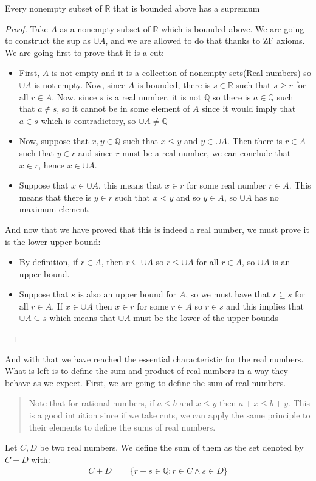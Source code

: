 \documentclass{tufte-handout}
\begin{document}
\begin{theorem}
	Every nonempty subset of $\mathbb{R}$ that is bounded above has a supremum
\end{theorem}
\begin{proof}
	Take $A$ as a nonempty subset of $\mathbb{R}$ which is bounded above. We are going to construct the sup as $\cup A$, and we are allowed to do that thanks to ZF axioms. We are going first to prove that it is a cut:
	\begin{itemize}
		\item First, $A$ is not empty and it is a collection of nonempty sets(Real numbers) so $\cup A$ is not empty. Now, since $A$ is bounded, there is $s \in \mathbb{R}$ such that $s \ge r$ for all $r \in A$. Now, since $s$ is a real number, it is not $\mathbb{Q}$ so there is $a \in \mathbb{Q}$ such that $a \not \in s$, so it cannot be in some element of $A$ since it would imply that $a \in s$ which is contradictory, so $\cup A \neq \mathbb{Q}$
		\item Now, suppose that $x, y \in \mathbb{Q}$ such that $x \le y$ and $y \in \cup A$. Then there is $r \in A$ such that $y \in r$ and since $r$ must be a real number, we can conclude that $x \in r$, hence $x \in \cup A$.
		\item Suppose that $x \in \cup A$, this means that $x \in r$ for some real number $r \in A$. This means that there is $y \in r$ such that $x < y$ and so $y \in A$, so $\cup A$ has no maximum element.
	\end{itemize}
	And now that we have proved that this is indeed a real number, we must prove it is the lower upper bound:
	\begin{itemize}
		\item By definition, if $r \in A$, then $r \subseteq \cup A$ so $r \le \cup A$ for all $r \in A$, so $\cup A$ is an upper bound.
		\item Suppose that $s$ is also an upper bound for $A$, so we must have that $r \subseteq s$ for all $r \in A$. If $x \in \cup A$ then $x \in r$ for some $r \in A$ so $r \in s$ and this implies that $\cup A \subseteq s$ which means that $\cup A$ must be the lower of the upper bounds
	\end{itemize}
\end{proof}

And with that we have reached the essential characteristic for the real numbers. What is left is to define the sum and product of real numbers in a way they behave as we expect. First, we are going to define the sum of real numbers.
\begin{quote}
	Note that for rational numbers, if $a \le b$ and $x \le y$ then $a + x \le b + y$. This is a good intuition since if we take cuts, we can apply the same principle to their elements to define the sums of real numbers.
\end{quote}
\begin{definition}
	Let $C, D$ be two real numbers. We define the sum of them as the set denoted by $C + D$ with:
	\begin{align*}
		C + D &= \{r + s \in \mathbb{Q}: r \in C \wedge s \in D\}
	\end{align*}
\end{definition}
\end{document}
